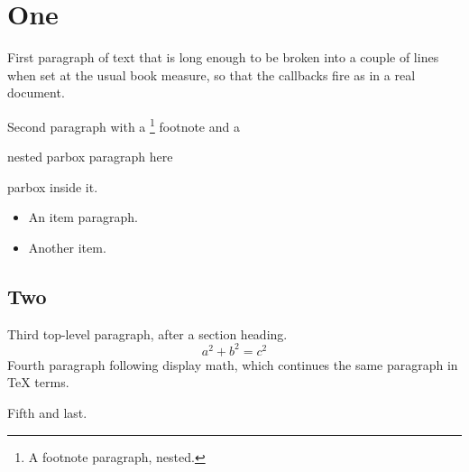 \documentclass{book}
\begin{document}
\chapter{One}
First paragraph of text that is long enough to be broken into a couple of lines when
set at the usual book measure, so that the callbacks fire as in a real document.

Second paragraph with a \footnote{A footnote paragraph, nested.} footnote and a
\parbox{3cm}{nested parbox paragraph here} parbox inside it.

\begin{itemize}
\item An item paragraph.
\item Another item.
\end{itemize}

\section{Two}
Third top-level paragraph, after a section heading.
\[ a^2 + b^2 = c^2 \]
Fourth paragraph following display math, which continues the same paragraph in TeX terms.

Fifth and last.
\end{document}
